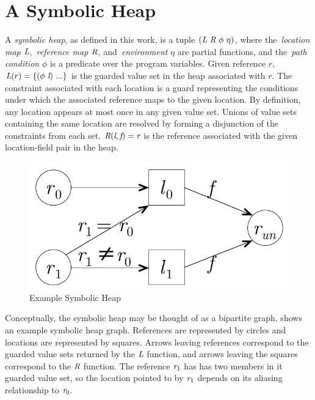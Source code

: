 \section{A Symbolic Heap}
A \emph{symbolic heap}, as defined in this work, is a tuple
$(\emph{L}\ \emph{R}\ \phi\ \eta)$, where the~\emph{location map}
$\emph{L}$,~\emph{reference map} $\emph{R}$, and~\emph{environment}
$\eta$ are partial functions, and the~\emph{path condition} $\phi$ is
a predicate over the program variables. Given reference $r$,
$\cfgnt{L}(r) = \{(\phi\ \cfgnt{l})\ ...\}$ is the guarded value set
in the heap associated with $r$. The constraint associated with each
location is a guard representing the conditions under which the
associated reference maps to the given location. By definition, any
location appears at most once in any given value set. Unions of value
sets containing the same location are resolved by forming a
disjunction of the constraints from each set. $\emph{R}(\emph{l},
\emph{f}) = \emph{r}$ is the reference associated with the given
location-field pair in the heap. 

\begin{figure}[t]
\begin{center}
\includegraphics[scale=0.5]{../figs/simple_heap_scratch.pdf}
\end{center}
\caption{Example Symbolic Heap}
\label{fig:exampleHeap}
\end{figure}

Conceptually, the symbolic heap may be thought of as a bipartite
graph.  shows an example symbolic heap
graph. References are represented by circles and locations are
represented by squares. Arrows leaving references correspond to the
guarded value sets returned by the $\emph{L}$ function, and arrows
leaving the squares correspond to the $\emph{R}$ function. The
reference $\emph{r}_1$ has has two members in it guarded value set,
so the location pointed to by $\emph{r}_1$ depends on its aliasing
relationship to $\emph{r}_0$.

